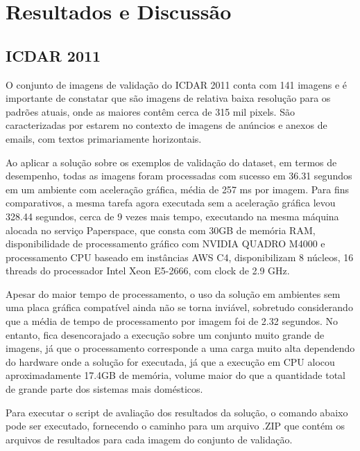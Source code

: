 \chapter{Resultados e Discussão}\label{cap:resultados}

\lipsum[72]


\section{ICDAR 2011}\label{sec:results_icdar_2011}
O conjunto de imagens de validação do ICDAR 2011 conta com 141 imagens e é importante de constatar que são imagens de relativa baixa resolução para os padrões atuais, onde as maiores contêm cerca de 315 mil pixels. São caracterizadas por estarem no contexto de imagens de anúncios e anexos de emails, com textos primariamente horizontais.

Ao aplicar a solução sobre os exemplos de validação do dataset, em termos de desempenho, todas as imagens foram processadas com sucesso em 36.31 segundos em um ambiente com aceleração gráfica, média de 257 ms por imagem. Para fins comparativos, a mesma tarefa agora executada sem a aceleração gráfica levou 328.44 segundos, cerca de 9 vezes mais tempo, executando na mesma máquina alocada no serviço Paperspace, que consta com 30GB de memória RAM, disponibilidade de processamento gráfico com NVIDIA QUADRO M4000 e processamento CPU baseado em instâncias AWS C4, disponibilizam 8 núcleos, 16 threads do processador Intel Xeon E5-2666, com clock de 2.9 GHz.

Apesar do maior tempo de processamento, o uso da solução em ambientes sem uma placa gráfica compatível ainda não se torna inviável, sobretudo considerando que a média de tempo de processamento por imagem foi de 2.32 segundos. No entanto, fica desencorajado a execução sobre um conjunto muito grande de imagens, já que o processamento corresponde a uma carga muito alta dependendo do hardware onde a solução for executada, já que a execução em CPU alocou aproximadamente 17.4GB de memória, volume maior do que a quantidade total de grande parte dos sistemas mais domésticos.

Para executar o script de avaliação dos resultados da solução, o comando abaixo pode ser executado, fornecendo o caminho para um arquivo .ZIP que contém os arquivos de resultados para cada imagem do conjunto de validação.


